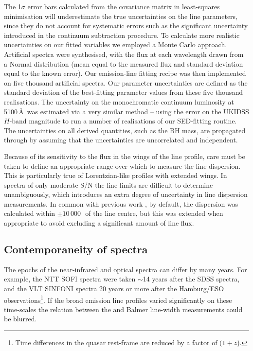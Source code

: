 The 1$\sigma$ error bars calculated from the covariance matrix in least-squares minimisation will underestimate the true uncertainties on the line parameters, since they do not account for systematic errors such as the significant uncertainty introduced in the continuum subtraction procedure.  
To calculate more realistic uncertainties on our fitted variables we employed a Monte Carlo approach. 
Artificial spectra were synthesised, with the flux at each wavelength drawn from a Normal distribution (mean equal to the measured flux and standard deviation equal to the known error). 
Our emission-line fitting recipe was then implemented on five thousand artificial spectra.  
Our parameter uncertainties are defined as the standard deviation of the best-fitting parameter values from these five thousand realisations.  
The uncertainty on the monochromatic continuum luminosity at 5100\,\AA\, was estimated via a very similar method -- using the error on the UKIDSS $H$-band magnitude to run a number of realisations of our SED-fitting routine. 
The uncertainties on all derived quantities, such as the BH mass, are propagated through by assuming that the uncertainties are uncorrelated and independent. 

Because of its sensitivity to the flux in the wings of the line profile, care must be taken to define an appropriate range over which to measure the line dispersion. 
This is particularly true of Lorentzian-like profiles with extended wings.
In spectra of only moderate S/N the line limits are difficult to determine unambiguously, which introduces an extra degree of uncertainty in line dispersion measurements.  
In common with previous work \citep[e.g.][]{vestergaard06}, by default, the dispersion was calculated within $\pm 10\,000$\,\kms\, of the line centre, but this was extended when appropriate to avoid excluding a significant amount of line flux. 


\subsection{Contemporaneity of spectra}

The epochs of the near-infrared and optical spectra can differ by many years.
For example, the NTT SOFI spectra were taken $\sim$14 years after the SDSS spectra, and the VLT SINFONI spectra 20 years or more after the Hamburg/ESO observations\footnote{Time differences in the quasar rest-frame are reduced by a factor of ($1 + z$).}.
If the broad emission line profiles varied significantly on these time-scales the relation between the  and Balmer line-width measurements could be blurred. 


